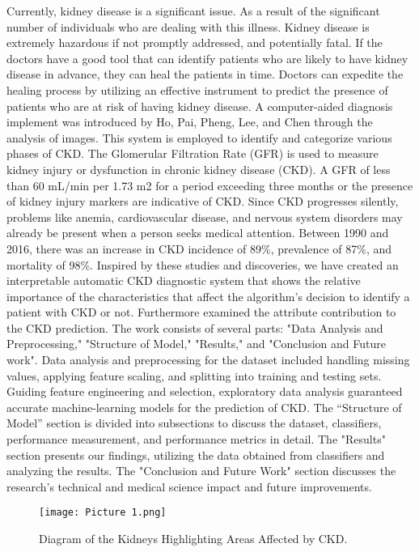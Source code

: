 \documentclass[conference]{IEEEtran}
\begin{document}
Currently, kidney disease is a significant issue. As a result of the significant number of individuals who are dealing with this illness. Kidney disease is extremely hazardous if not promptly addressed, and potentially fatal. If the doctors have a good tool that can identify patients who are likely to have kidney disease in advance, they can heal the patients in time. Doctors can expedite the healing process by utilizing an effective instrument to predict the presence of patients who are at risk of having kidney disease. A computer-aided diagnosis implement was introduced by Ho, Pai, Pheng, Lee, and Chen \cite{1} through the analysis of images. This system is employed to identify and categorize various phases of CKD. The Glomerular Filtration Rate (GFR) is used to measure kidney injury or dysfunction in chronic kidney disease (CKD). A GFR of less than 60 mL/min per 1.73 m2 for a period exceeding three months or the presence of kidney injury markers are indicative of CKD\cite{2}\cite{3}. Since CKD progresses silently, problems like anemia, cardiovascular disease, and nervous system disorders may already be present when a person seeks medical attention. Between 1990 and 2016, there was an increase in CKD incidence of 89\%, prevalence of 87\%, and mortality of 98\%\cite{4}. Inspired by these studies and discoveries, we have created an interpretable automatic CKD diagnostic system that shows the relative importance of the characteristics that affect the algorithm's decision to identify a patient with CKD or not. Furthermore examined the attribute contribution to the CKD prediction. The work consists of several parts: "Data Analysis and Preprocessing," "Structure of Model," "Results," and "Conclusion and Future work". Data analysis and preprocessing for the dataset included handling missing values, applying feature scaling, and splitting into training and testing sets. Guiding feature engineering and selection, exploratory data analysis guaranteed accurate machine-learning models for the prediction of CKD. The “Structure of Model” section is divided into subsections to discuss the dataset, classifiers, performance measurement, and performance metrics in detail. The "Results" section presents our findings, utilizing the data obtained from classifiers and analyzing the results. The "Conclusion and Future Work" section discusses the research's technical and medical science impact and future improvements.

\begin{figure}[ht]
    \centering
    \texttt{[image: Picture 1.png]}
    \caption{Diagram of the Kidneys Highlighting Areas Affected by CKD.} 
    \label{fig1}
\end{figure}
\end{document}
